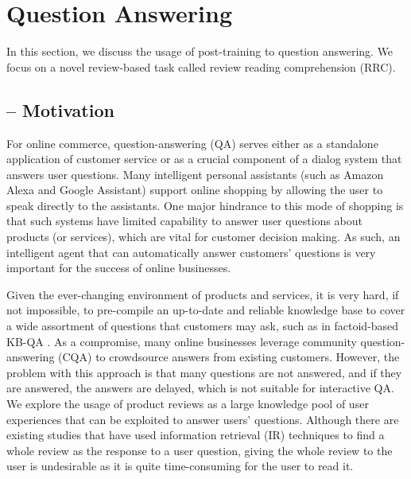 
\section{Question Answering}
\label{chap6:sec:qa}

In this section, we discuss the usage of post-training to question answering.
We focus on a novel review-based task called review reading comprehension (RRC).

\subsection{-- Motivation}
\label{chap6:sec:rrc}

For online commerce, question-answering (QA) serves either as a standalone application of customer service or as a crucial component of a dialog system that answers user questions.
Many intelligent personal assistants (such as Amazon Alexa and Google Assistant) support online shopping by allowing the user to speak directly to the assistants. 
One major hindrance to this mode of shopping is that such systems have limited capability to answer user questions about products (or services), which are vital for customer decision making.
As such, an intelligent agent that can automatically answer customers' questions is very important for the success of online businesses.

Given the ever-changing environment of products and services, it is very hard, if not impossible, to pre-compile an up-to-date and reliable knowledge base to cover a wide assortment of questions that customers may ask, such as in factoid-based KB-QA \cite{xu2016question,fader2014open,kwok2001scaling,yin2015neural}.
As a compromise, many online businesses leverage community question-answering (CQA) \cite{mcauley2016addressing} to crowdsource answers from existing customers. However, the problem with this approach is that many questions are not answered, and if they are answered, the answers are delayed, which is not suitable for interactive QA.
We explore the usage of product reviews as a large knowledge pool of user experiences that can be exploited to answer users' questions. Although there are existing studies that have used information retrieval (IR) techniques \cite{mcauley2016addressing,yu2018aware} to find a whole review as the response to a user question, giving the whole review to the user is undesirable as it is quite time-consuming for the user to read it.


